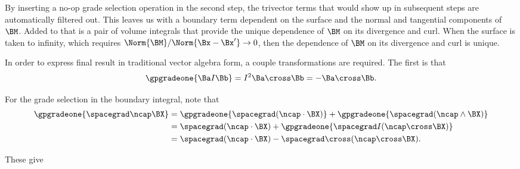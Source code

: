 By inserting a no-op grade selection operation in the second step, the trivector terms that would show up in subsequent steps are automatically filtered out.
This leaves us with a boundary term dependent on the surface and the normal and tangential components of \( \BM \).
Added to that is a pair of volume integrals that provide the unique dependence of \( \BM \) on its divergence and curl.
When the surface is taken to infinity, which requires \( \Norm{\BM}/\Norm{\Bx - \Bx'} \rightarrow 0 \), then the dependence of \( \BM \) on its divergence and curl is unique.

In order to express final result in traditional vector algebra form, a couple transformations are required.
The first is that
\begin{equation}\label{eqn:helmholtzDerviationMultivectorSolution:800}
\gpgradeone{ \Ba I \Bb } = I^2 \Ba \cross \Bb = -\Ba \cross \Bb.
\end{equation}

For the grade selection in the boundary integral, note that
\begin{equation}\label{eqn:helmholtzDerviationMultivectorSolution:740}
\begin{aligned}
\gpgradeone{ \spacegrad \ncap \BX }
&= \gpgradeone{ \spacegrad (\ncap \cdot \BX) } + \gpgradeone{ \spacegrad (\ncap \wedge \BX) } \\
&= \spacegrad (\ncap \cdot \BX) + \gpgradeone{ \spacegrad I (\ncap \cross \BX) } \\
&= \spacegrad (\ncap \cdot \BX) - \spacegrad \cross (\ncap \cross \BX).
\end{aligned}
\end{equation}

These give
